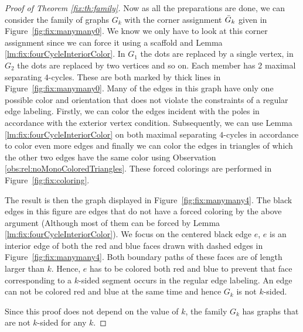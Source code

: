 \begin{proof}[Proof of Theorem \ref{fix:th:family}]
  Now as all the preparations are done, we can consider the family of graphs $G_k$ with the corner assignment $\bar{G}_k$ given in Figure~\ref{fig:fix:manymany0}.
  We know we only have to look at this corner assignment since we can force it using a scaffold and Lemma \ref{lm:fix:fourCycleInteriorColor}.
  In $G_1$ the dots are replaced by a single vertex, in $G_2$ the dots are replaced by two vertices and so on.
  Each member has 2 maximal separating $4$-cycles.
  These are both marked by thick lines in Figure~\ref{fig:fix:manymany0}.
  Many of the edges in this graph have only one possible color and orientation that does not violate the constraints of a regular edge labeling.
  Firstly, we can color the edges incident with the poles in accordance with the exterior vertex condition.
  Subsequently, we can use Lemma \ref{lm:fix:fourCycleInteriorColor} on both maximal separating $4$-cycles in accordance to color even more edges and finally we can color the edges in triangles of which the other two edges have  the same color using Observation \ref{obs:rel:noMonoColoredTriangles}.
  These forced colorings are performed in Figure~\ref{fig:fix:coloring}.

  The result is then the graph displayed in Figure~\ref{fig:fix:manymany4}. The black edges in this figure are edges that do not have a forced coloring by the above argument (Although most of them can be forced by Lemma \ref{lm:fix:fourCycleInteriorColor}).
  We focus on the centered black edge $e$, $e$ is an interior edge of both the red and blue faces drawn with dashed edges in Figure~\ref{fig:fix:manymany4}. Both boundary paths of these faces are of length larger than $k$. Hence, $e$ has to be colored both red and blue to prevent that face corresponding to a $k$-sided segment occurs in the regular edge labeling. An edge can not be colored red and blue at the same time and hence $G_k$ is not $k$-sided.

  Since this proof does not depend on the value of $k$, the family $G_k$ has graphs that are not $k$-sided for any $k$.
\end{proof}


  \quad

  \quad

